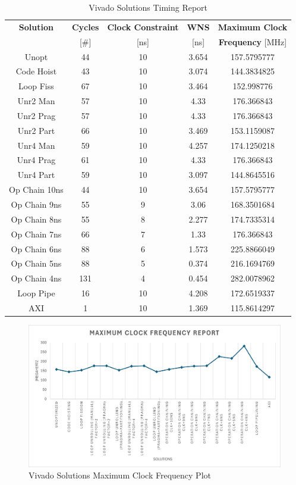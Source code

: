 \begin{table}[H]
	\centering
	\begin{tabular}{|c|c|c|c|c|}
		\hline
		\textbf{Solution} & \textbf{Cycles} & \textbf{Clock Constraint} & \textbf{WNS} & \textbf{Maximum Clock}\\
		& [\#] & [ns] & [ns] & \textbf{Frequency} [MHz]\\
		\hline
		Unopt & 44 & 10 & 3.654 & 157.5795777\\
		Code Hoist & 43 & 10 & 3.074 & 144.3834825\\
		Loop Fiss & 67 & 10 & 3.464 & 152.998776\\
		Unr2 Man & 57 & 10 & 4.33 & 176.366843\\
		Unr2 Prag & 57 & 10 & 4.33 & 176.366843\\
		Unr2 Part & 66 & 10 & 3.469 & 153.1159087\\
		Unr4 Man & 59 & 10 & 4.257 & 174.1250218\\
		Unr4 Prag & 61 & 10 & 4.33 & 176.366843\\
		Unr4 Part & 59 & 10 & 3.097 & 144.8645516\\
		Op Chain 10ns & 44 & 10 & 3.654 & 157.5795777\\
		Op Chain 9ns & 55 & 9 & 3.06 & 168.3501684\\
		Op Chain 8ns & 55 & 8 & 2.277 & 174.7335314\\
		Op Chain 7ns & 66 & 7 & 1.33 & 176.366843\\
		Op Chain 6ns & 88 & 6 & 1.573 & 225.8866049\\
		Op Chain 5ns & 88 & 5 & 0.374 & 216.1694769\\
		Op Chain 4ns & 131 & 4 & 0.454 & 282.0078962\\
		Loop Pipe & 16 & 10 & 4.208 & 172.6519337\\
		AXI & 1 & 10 & 1.369 & 115.8614297\\
		\hline
	\end{tabular}
	\caption{Vivado Solutions Timing Report}
	\label{tab:vivado-solutions-timing-report}
\end{table}

\begin{figure}[H]
	\centering
	\includegraphics[width=0.7\textheight]{conclusions/frequency.png}
	\caption{Vivado Solutions Maximum Clock Frequency Plot}
	\label{fig:vivado-maximum-clock-frequency-plot}
\end{figure}

